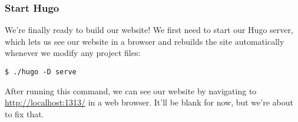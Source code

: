 \begin{frame}[fragile]
    \frametitle{Start Hugo}

    We're finally ready to build our website! We first need to start our Hugo server, which lets us see our website
    in a browser and rebuilds the site automatically whenever we modify any project files:

    \bigskip

    \begin{lstlisting}[style=saneCode,gobble=8]
        $ ./hugo -D serve
    \end{lstlisting}

    \bigskip

    After running this command, we can see our website by navigating to \url{http://localhost:1313/} in a web
    browser. It'll be blank for now, but we're about to fix that.
\end{frame}